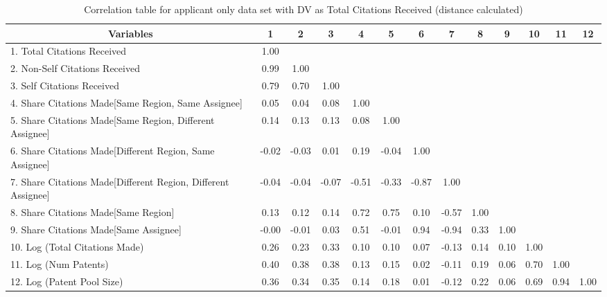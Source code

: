 \begin{table}[htbp]\centering \caption{Correlation table for applicant only data set with DV as Total Citations Received (distance calculated)\label{a.tcorrelation}}
\scriptsize
\singlespacing
\begin{tabular}{l  c  c  c  c  c  c  c  c  c  c  c  c }\hline\hline
\multicolumn{1}{c}{Variables} &1&2&3&4&5&6&7&8&9&10&11&12\\ \hline
1. Total Citations Received&1.00\\
2. Non-Self Citations Received&0.99&1.00\\
3. Self Citations Received&0.79&0.70&1.00\\
4. Share Citations Made[Same Region, Same Assignee]&0.05&0.04&0.08&1.00\\
5. Share Citations Made[Same Region, Different Assignee]&0.14&0.13&0.13&0.08&1.00\\
6. Share Citations Made[Different Region, Same Assignee]&-0.02&-0.03&0.01&0.19&-0.04&1.00\\
7. Share Citations Made[Different Region, Different Assignee]&-0.04&-0.04&-0.07&-0.51&-0.33&-0.87&1.00\\
8. Share Citations Made[Same Region]&0.13&0.12&0.14&0.72&0.75&0.10&-0.57&1.00\\
9. Share Citations Made[Same Assignee]&-0.00&-0.01&0.03&0.51&-0.01&0.94&-0.94&0.33&1.00\\
10. Log (Total Citations Made)&0.26&0.23&0.33&0.10&0.10&0.07&-0.13&0.14&0.10&1.00\\
11. Log (Num Patents)&0.40&0.38&0.38&0.13&0.15&0.02&-0.11&0.19&0.06&0.70&1.00\\
12. Log (Patent Pool Size)&0.36&0.34&0.35&0.14&0.18&0.01&-0.12&0.22&0.06&0.69&0.94&1.00\\
\hline \hline 
 \end{tabular}
\end{table}
